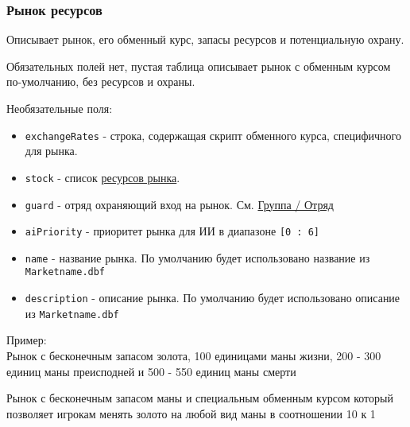 \subsubsection{Рынок ресурсов}
\label{resourcemarket}
Описывает рынок, его обменный курс, запасы ресурсов и потенциальную охрану.

Обязательных полей нет, пустая таблица описывает рынок с обменным курсом по-умолчанию, без ресурсов и охраны.

Необязательные поля:
\begin{itemize}
\item \texttt{exchangeRates} - строка, содержащая скрипт обменного курса, специфичного для рынка.
\item \texttt{stock} - список \hyperref[marketresource]{ресурсов рынка}.
\item \texttt{guard} - отряд охраняющий вход на рынок. См. \hyperref[group]{Группа / Отряд}
\item \texttt{aiPriority} - приоритет рынка для ИИ в диапазоне \texttt{[0 : 6]}
\item \texttt{name} - название рынка. По умолчанию будет использовано название из \texttt{Marketname.dbf}
\item \texttt{description} - описание рынка. По умолчанию будет использовано описание из \texttt{Marketname.dbf}
\end{itemize}

Пример:\\
Рынок с бесконечным запасом золота, 100 единицами маны жизни, 200 - 300 единиц маны преисподней и 500 - 550 единиц маны смерти

\begin{figure}[H]

\end{figure}

Рынок с бесконечным запасом маны и специальным обменным курсом который позволяет игрокам менять золото на любой вид маны в соотношении 10 к 1

\begin{figure}[H]

\end{figure}